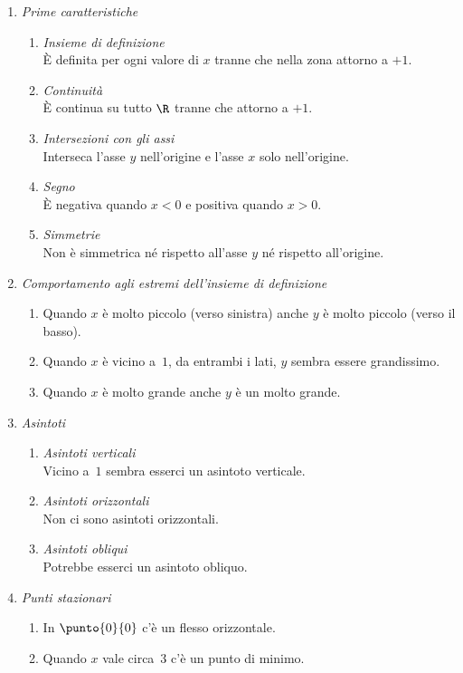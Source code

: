 \begin{enumerate} [nosep]
\item \emph{Prime caratteristiche}
\begin{enumerate} [nosep]
\item \emph{Insieme di definizione}\\
È definita per ogni valore di \(x\) tranne che nella zona attorno a \(+1\).
\item \emph{Continuità}\\
È continua su tutto \(\R\) tranne che attorno a \(+1\).
\item \emph{Intersezioni con gli assi}\\
Interseca l'asse \(y\) nell'origine e l'asse \(x\) solo nell'origine.
\item \emph{Segno}\\
È negativa quando \(x<0\) e positiva quando \(x>0\).
\item \emph{Simmetrie}\\
Non è simmetrica né rispetto all'asse \(y\) né rispetto all'origine.
\end{enumerate}

\item \emph{Comportamento agli estremi dell'insieme di definizione}
\begin{enumerate} [nosep]
\item Quando \(x\) è molto piccolo (verso sinistra) anche \(y\) 
è molto piccolo (verso il basso).
\item Quando \(x\) è vicino a~\(1\), da entrambi i lati, 
\(y\) sembra essere grandissimo.
\item Quando \(x\) è molto grande anche \(y\) è un molto grande.
\end{enumerate}

\item \emph{Asintoti}
\begin{enumerate} [nosep]
\item \emph{Asintoti verticali}\\
Vicino a~\(1\) sembra esserci un asintoto verticale.
\item \emph{Asintoti orizzontali}\\
Non ci sono asintoti orizzontali.
\item \emph{Asintoti obliqui}\\
Potrebbe esserci un asintoto obliquo.
\end{enumerate}

\item \emph{Punti stazionari}
\begin{enumerate} [nosep]
\item In \(\punto{0}{0}\) c'è un flesso orizzontale.
\item Quando \(x\) vale circa~3 c'è un punto di minimo.
\end{enumerate}


\end{enumerate}
